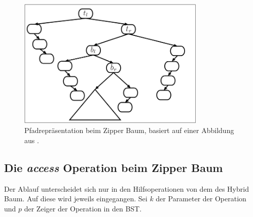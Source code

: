 \documentclass[a4paper,12pt]{article}
\begin{document}
\begin{figure}[h]
	\centering
	\includegraphics[width= 0.8\textwidth]{"Medien/Zipper/zipperPathRep"}
	\caption{Pfadrepräsentation beim Zipper Baum, basiert auf einer Abbildung aus \cite{zipper}. }
	\label{fig:zipperPathRep}
\end{figure}






\subsection{Die \textit{access} Operation beim Zipper Baum}
Der Ablauf unterscheidet sich nur in den Hilfsoperationen von dem des Hybrid Baum. Auf diese wird jeweils eingegangen. 
Sei $k$ der Parameter der Operation und $p$ der Zeiger der Operation in den BST. 
\end{document}
